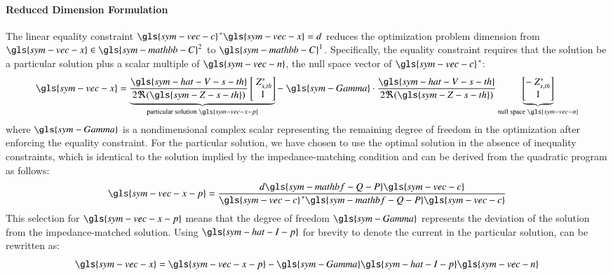 \paragraph{Reduced Dimension Formulation}
The linear equality constraint $\gls{sym-vec-c}^{\,*}\gls{sym-vec-x} = d$ reduces the optimization problem dimension from $\gls{sym-vec-x} \in \gls{sym-mathbb-C}^2$ to $\gls{sym-mathbb-C}^1$.
Specifically, the equality constraint requires that the solution be a particular solution plus a scalar multiple of $\gls{sym-vec-n}$, the null space vector of $\gls{sym-vec-c}^{\,*}$:
\begin{equation}\label{eq:x-p-plus-nullspace}
    \gls{sym-vec-x} = \underbrace{
        \frac{\gls{sym-hat-V-s-th}}{2\Re(\gls{sym-Z-s-th})}
        \begin{bmatrix} \ Z_{s,th}^* \\ 1 \end{bmatrix}
    }_{
        \textrm{particular solution } \gls{sym-vec-x-p}}
    -~ \gls{sym-Gamma} \cdot \frac{\gls{sym-hat-V-s-th}}{2\Re(\gls{sym-Z-s-th})}
    \underbrace{
        \begin{bmatrix} -\ Z_{s,th}^* \\ 1 \end{bmatrix}
    }_{
        \textrm{null space } \gls{sym-vec-n}}
\end{equation}
where $\gls{sym-Gamma}$ is a nondimensional complex scalar representing the remaining degree of freedom in the optimization after enforcing the equality constraint.
For the particular solution, we have chosen to use the optimal solution in the absence of inequality constraints, which is identical to the solution implied by the impedance-matching condition  and can be derived from the quadratic program as follows:
\begin{equation}\label{eq:x-p}
    \gls{sym-vec-x-p} = \frac{d \gls{sym-mathbf-Q-P}\gls{sym-vec-c}}{\gls{sym-vec-c}^{\,*}\gls{sym-mathbf-Q-P}\gls{sym-vec-c}}
\end{equation}
This selection for $\gls{sym-vec-x-p}$ means that the degree of freedom $\gls{sym-Gamma}$ represents the deviation of the solution from the impedance-matched solution.
Using $\gls{sym-hat-I-p}$ for brevity to denote the current in the particular solution,  can be rewritten as:
\begin{equation}\label{eq:x-p-plus-nullspace-simplified}
\gls{sym-vec-x} = \gls{sym-vec-x-p} - \gls{sym-Gamma} \gls{sym-hat-I-p} \gls{sym-vec-n}
\end{equation}

